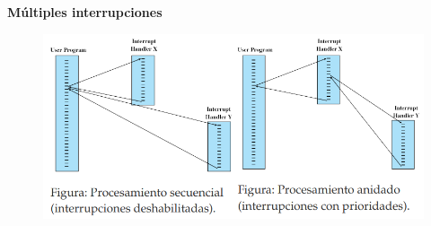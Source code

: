 \documentclass{article}
\begin{document}
\textbf{Múltiples interrupciones}
\begin{figure}[h]
\centering
\includegraphics[scale=1,width=\textwidth]{multinterrupcion.png}
\end{figure}
\end{document}
